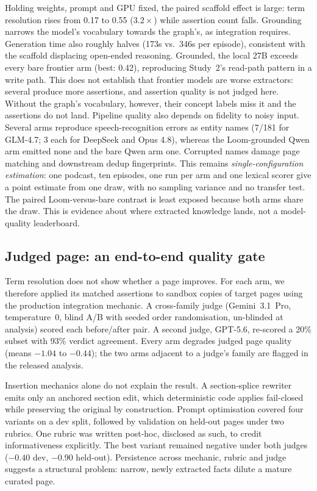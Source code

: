 \documentclass[10pt,twocolumn]{article}
\begin{document}
Holding weights, prompt and GPU fixed, the paired scaffold effect is large: term resolution
rises from 0.17 to 0.55 ($3.2\times$) while assertion count falls. Grounding narrows the model's
vocabulary towards the graph's, as integration requires. Generation time also roughly halves
(173s vs.\ 346s per episode), consistent with the scaffold displacing open-ended reasoning.
Grounded, the local 27B exceeds every bare frontier arm (best: 0.42), reproducing Study~2's
read-path pattern in a write path. This does not establish that frontier models are worse
extractors: several produce more assertions, and assertion quality is not judged here. Without
the graph's vocabulary, however, their concept labels miss it and the assertions do not land.
Pipeline quality also depends on fidelity to noisy input. Several arms reproduce speech-recognition
errors as entity names (7/181 for GLM-4.7; 3 each for DeepSeek and Opus 4.8), whereas the
Loom-grounded Qwen arm emitted none and the bare Qwen arm one. Corrupted names damage page matching and downstream dedup
fingerprints.
This remains \emph{single-configuration estimation}: one podcast, ten episodes, one run per arm and
one lexical scorer give a point estimate from one draw, with no sampling variance and no transfer test.
The paired Loom-versus-bare contrast is least exposed because both arms share the draw. This is evidence
about where extracted knowledge lands, not a model-quality leaderboard.

\subsection{Judged page: an end-to-end quality gate}\label{sec:pagejudge}
Term resolution does not show whether a page improves. For each arm, we therefore applied its
matched assertions to sandbox copies of target pages using the production integration mechanic.
A cross-family judge (Gemini~3.1~Pro, temperature~0, blind A/B with seeded order randomisation,
un-blinded at analysis) scored each before/after pair. A second judge, GPT-5.6, re-scored a
20\% subset with 93\% verdict agreement. Every arm degrades judged page quality (means $-1.04$
to $-0.44$); the two arms adjacent to a judge's family are flagged in the released analysis.

Insertion mechanics alone do not explain the result. A section-splice rewriter emits only
an anchored section edit, which deterministic code applies fail-closed while preserving the
original by construction. Prompt optimisation covered four variants on a dev split, followed
by validation on held-out pages under two rubrics. One rubric was written post-hoc, disclosed
as such, to credit informativeness explicitly. The best variant remained negative under both
judges ($-0.40$ dev, $-0.90$ held-out). Persistence across mechanic, rubric and judge suggests
a structural problem: narrow, newly extracted facts dilute a mature curated page.
\end{document}
